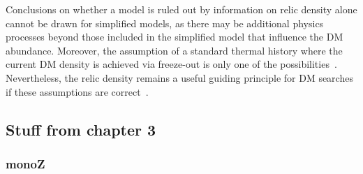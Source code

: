 Conclusions on whether a model is ruled out by information on relic density alone cannot be drawn for simplified models, 
as there may be additional physics processes beyond those included in the simplified model that influence the DM abundance.
Moreover, the assumption of a standard thermal history where the current DM density is achieved via freeze-out  
is only one of the possibilities~\cite{Bernal:2017kxu}. 
Nevertheless, the relic density remains a useful guiding principle for DM searches if these assumptions are correct~\cite{Busoni:2014gta,Catena:2017xqq}. 






\subsection{Stuff from chapter 3}

\subsubsection{monoZ}


